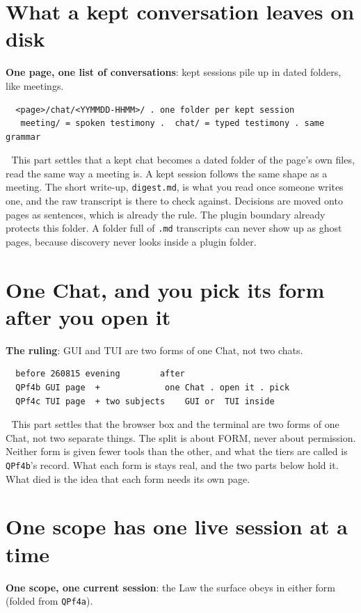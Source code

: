 
\section{What a kept conversation leaves on disk}
\textbf{One page, one list of conversations}: kept sessions pile up in dated folders, like meetings.

\begin{verbatim}
  <page>/chat/<YYMMDD-HHMM>/ . one folder per kept session
   meeting/ = spoken testimony .  chat/ = typed testimony . same grammar
\end{verbatim}
📌 This part settles that a kept chat becomes a dated folder of the page's own files, read the same way a meeting is. A kept session follows the same shape as a meeting. The short write-up, \texttt{digest.md}, is what you read once someone writes one, and the raw transcript is there to check against. Decisions are moved onto pages as sentences, which is already the rule. The plugin boundary already protects this folder. A folder full of \texttt{.md} transcripts can never show up as ghost pages, because discovery never looks inside a plugin folder.


\section{One Chat, and you pick its form after you open it}
\textbf{The ruling}: GUI and TUI are two forms of one Chat, not two chats.

\begin{verbatim}
  before 260815 evening        after
  QPf4b GUI page  +             one Chat . open it . pick
  QPf4c TUI page  + two subjects    GUI or  TUI inside
\end{verbatim}
📌 This part settles that the browser box and the terminal are two forms of one Chat, not two separate things. The split is about FORM, never about permission. Neither form is given fewer tools than the other, and what the tiers are called is \texttt{QPf4b}'s record. What each form is stays real, and the two parts below hold it. What died is the idea that each form needs its own page.


\section{One scope has one live session at a time}
\textbf{One scope, one current session}: the Law the surface obeys in either form (folded from \texttt{QPf4a}).

